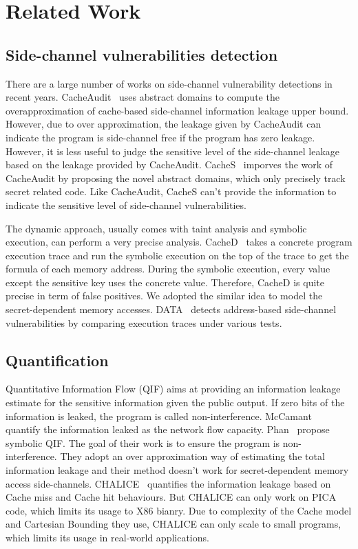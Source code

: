 \section{Related Work}
\subsection{Side-channel vulnerabilities detection}

There are a large number of works on side-channel vulnerability detections in recent years.
CacheAudit~\cite{182946} uses abstract domains to compute the overapproximation of cache-based
side-channel information leakage upper bound. However, due to over approximation, the leakage
given by CacheAudit can indicate the program is side-channel free if the program has zero leakage. 
However, it is less useful to judge the sensitive level of the side-channel leakage based on the
leakage provided by CacheAudit. CacheS~\cite{236338} imporves the work of CacheAudit by proposing 
the novel abstract domains, which only precisely track secret related code. Like CacheAudit, CacheS
can't provide the information to indicate the sensitive level of side-channel vulnerabilities.

The dynamic approach, usually comes with taint analysis and symbolic execution, can perform a very 
precise analysis. CacheD~\cite{203878} takes a concrete program execution trace and run the symbolic
execution on the top of the trace to get the formula of each memory address. During the symbolic
execution, every value except the sensitive key uses the concrete value. Therefore, CacheD is quite 
precise in term of false positives. We adopted the similar idea to model the  secret-dependent memory 
accesses.  DATA~\cite{217537} detects address-based side-channel vulnerabilities by comparing 
execution traces under various tests. 

\subsection{Quantification}
Quantitative Information Flow (QIF) aims at providing an information leakage estimate for the
sensitive information given the public output. If zero bits of the information is leaked, the 
program is called non-interference. McCamant~\cite{McCamantE2008} quantify the information leaked
as the network flow capacity. Phan~\cite{Phan:2012:SQI:2382756.2382791} propose symbolic QIF. The
goal of their work is to ensure the program is non-interference. They adopt an over
approximation way of estimating the total information leakage and their method doesn't work for
secret-dependent memory access side-channels. CHALICE~\cite{Chattopadhyay:2017:QIL:3127041.3127044}
quantifies the information leakage based on Cache miss and Cache hit behaviours. But CHALICE can only 
work on PICA code, which limits its usage to X86 bianry. Due to complexity of the Cache model and 
Cartesian Bounding they use, CHALICE can only scale to small programs, which limits its usage in
real-world applications.



